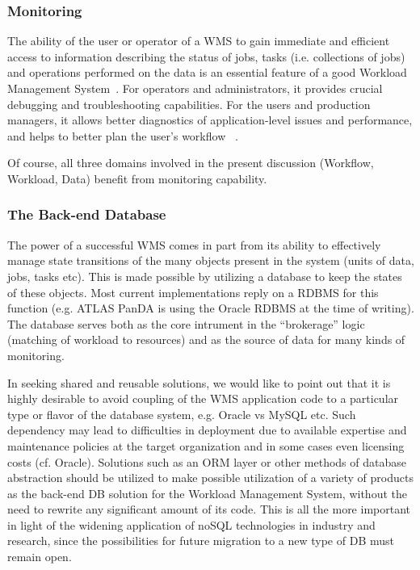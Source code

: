 \subsubsection{Monitoring}
The ability of the user or operator of a WMS to gain immediate and efficient access to information describing the status of jobs, tasks (i.e. collections of jobs) and operations performed on the data
is an essential feature of a good Workload Management System~\cite{pandamon_chep10}. For operators and administrators, it provides crucial debugging and troubleshooting
capabilities. For the users and production managers, it allows better diagnostics of application-level issues and performance, and helps to better plan the user's workflow
~\cite{pandamon_isgc14}.

Of course, all three domains involved in the present discussion (Workflow, Workload, Data) benefit from monitoring capability.

\subsubsection{The Back-end Database}
The power of a successful WMS comes in part from its ability to effectively manage state transitions of the many objects present
in the system (units of data, jobs, tasks etc). This is made possible by utilizing a database to keep the states of these objects.
Most current implementations reply on a RDBMS for this function (e.g. ATLAS PanDA is using the Oracle RDBMS at the time of writing).
The database serves both as the core intrument in the ``brokerage'' logic (matching of workload to resources) and as the source
of data for many kinds of monitoring.

In seeking shared and reusable solutions, we would like to point out that it is highly desirable to avoid coupling of the WMS application code to a particular
type or flavor of the database system, e.g. Oracle vs MySQL etc. Such dependency may lead to difficulties in deployment due to available
expertise and maintenance policies at the target organization and in some cases even licensing costs (cf. Oracle). Solutions such as an ORM layer
or other methods of database abstraction
should be utilized to make possible utilization of a variety of  products as the back-end DB solution for the Workload Management System,
without the need to rewrite any significant amount of its code. This is all the more important in light of the widening application of noSQL
technologies in industry and research, since the possibilities for future migration to a new type of DB must remain open.


